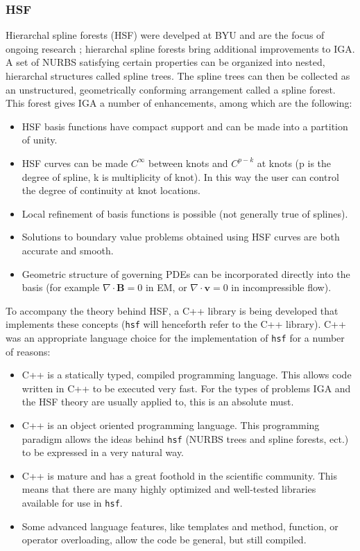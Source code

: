       \subsubsection{HSF} \label{ssub:hsfpy}

        Hierarchal spline forests (HSF) were develped at BYU and are the focus of ongoing research \cite{scott2013a}; hierarchal spline forests bring additional improvements to IGA. A set of NURBS satisfying certain properties can be organized into nested, hierarchal structures called spline trees.  The spline trees can then be collected as an unstructured, geometrically conforming arrangement called a spline forest. This forest gives IGA a number of enhancements, among which are the following:

    \begin{itemize}
      \item HSF basis functions have compact support and can be made into a partition of unity.
      \item HSF curves can be made $C^{\infty}$ between knots and $C^{p-k}$ at knots (p is the degree of spline, k is multiplicity of knot). In this way the user can control the degree of continuity at knot locations.
      \item Local refinement of basis functions is possible (not generally true of splines).
      \item Solutions to boundary value problems obtained using HSF curves are both accurate and smooth.
      \item Geometric structure of governing PDEs can be incorporated directly into the basis (for example $\nabla\cdot\mathbf{B} = 0$ in EM, or $\nabla\cdot\mathbf{v} = 0$ in incompressible flow).
    \end{itemize}
    \mainstretch{}

    To accompany the theory behind HSF, a C++ library is being developed that implements these concepts (\texttt{hsf} will henceforth refer to the C++ library). C++ was an appropriate language choice for the implementation of \texttt{hsf} for a number of reasons:

    \begin{itemize}
      \item C++ is a statically typed, compiled programming language. This allows code written in C++ to be executed very fast. For the types of problems IGA and the HSF theory are usually applied to, this is an absolute must.
      \item C++ is an object oriented programming language. This programming paradigm allows the ideas behind \texttt{hsf} (NURBS trees and spline forests, ect.) to be expressed in a very natural way.
      \item C++ is mature and has a great foothold in the scientific community. This means that there are many highly optimized and well-tested libraries available for use in \texttt{hsf}.
      \item Some advanced language features, like templates and method, function, or operator overloading, allow the code be general, but still compiled.
    \end{itemize}
    \mainstretch{}


